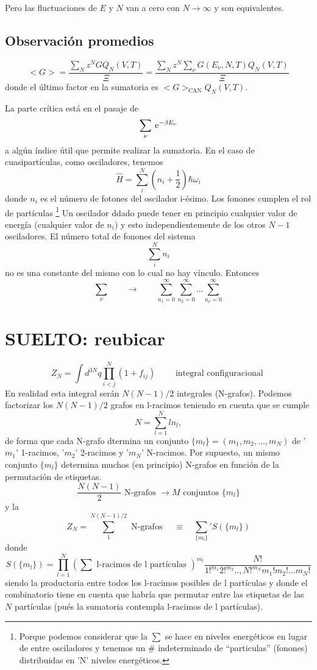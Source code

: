 \documentclass[10pt,oneside]{CBFT_book}
\begin{document}
Pero las fluctuaciones de $E$ y $N$ van a cero con $N \to \infty$ y son equivalentes.


\subsection{Observación promedios}

\[
	<G> = \frac{\sum_N z^N G Q_N(V,T) }{\Xi} = \frac{\sum_N z^N \sum_\nu G(E_\nu, N, T) Q_N(V,T) }{\Xi}
\]
donde el último factor en la sumatoria es $<G>_{\text{CAN}} Q_N(V,T)$.

La parte crítica está en el pasaje de 
\[
	\sum_\nu \:\mathrm{e}^{ -\beta E_\nu }
\]
a algún índice útil que permite realizar la sumatoria. En el caso de cuasipartículas, como osciladores, 
tenemos
\[
	\hat{H} = \sum_i^N \left( n_i + \frac{1}{2} \right) \hbar \omega_i 
\]
donde $ n_i $ es el número de fotones del oscilador i-ésimo. Los fonones cumplen el rol de partículas
\footnote{Porque podemos considerar que la $\sum$ se hace en niveles energéticos en lugar de entre osciladores
y tenemos un \# indeterminado de ``particulas'' (fonones) distribuidas en 'N' niveles energéticos.}
Un oscilador ddado puede tener en principio cualquier valor de energía (cualquier valor de $ n_i $) y esto 
independientemente de los otros $ N-1 $ osciladores. El número total de fonones del sistema
\[
	\sum_i^N n_i
\]
no es una constante del mismo con lo cual no hay vínculo. Entonces
\[
	\sum_\nu \qquad \rightarrow \qquad \sum_{n_1=0}^\infty \sum_{n_2=0}^\infty ... \sum_{n_\nu=0}^\infty
\]


\section{SUELTO: reubicar}

\[
	Z_N = \int d^{3N}q \prod_{i<j}^N (1+f_{ij}) \qquad \text{ integral configuracional }
\]
En realidad esta integral serán $ N(N-1)/2 $ integrales (N-grafos). Podemos factorizar los $ N(N-1)/2 $ grafos
en l-racimos teniendo en cuenta que se cumple
\[
	N = \sum_{l=1}^N ln_l,
\]
de forma que cada N-grafo dtermina un conjunto $ \{ m_l \} = (m_1,m_2, ..., m_N) $ de '$m_1$' 1-racimos, '$m_2$' 
2-racimos y '$m_N$' N-racimos. Por supuesto, un mismo conjunto $ \{ m_l \} $ determina muchos (en principio) N-grafos 
en función de la permutación de etiquetas.
\[
	\frac{N(N-1)}{2} \text{ N-grafos } \rightarrow M \text{ conjuntos } \{ m_l \}
\]
y la 
\[
	Z_N = \sum_1^{N(N-1)/2 } \text{ N-grafos } \quad \equiv \quad \sum_ {\{ m_l \}}' S(\{ m_l \})
\]
donde 
\[
	S(\{ m_l \}) = \prod_{l=1}^N \left( \sum \text{ l-racimos de l partículas }\right)^{m_l}
	\frac{N!}{ 1!^{m_1} 2!^{m_2} ..,N!^{m_N} m_1! m_2! ... m_N!}
\]
siendo la productoria entre todos los l-racimos posibles de l partículas y donde el combinatorio tiene en cuenta que 
habría que permutar entre las etiquetas de las $N$ partículas (pués la sumatoria contempla l-racimos de l partículas).
\end{document}
